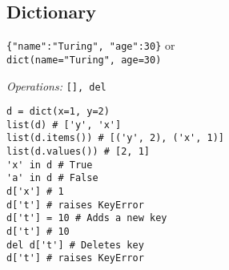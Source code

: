 \subsection{Dictionary}
\texttt{\{"name":"Turing", "age":30\}} or \\
\texttt{dict(name="Turing", age=30)}

\textit{Operations:} \texttt{[], del}
\begin{lstlisting}
d = dict(x=1, y=2)
list(d) # ['y', 'x']
list(d.items()) # [('y', 2), ('x', 1)]
list(d.values()) # [2, 1]
'x' in d # True
'a' in d # False
d['x'] # 1
d['t'] # raises KeyError
d['t'] = 10 # Adds a new key
d['t'] # 10
del d['t'] # Deletes key
d['t'] # raises KeyError
\end{lstlisting}
